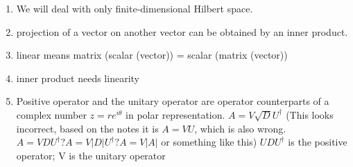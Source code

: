 \documentclass[a4paper,12pt]{amsbook}
\newcommand{\0}{{$|0\rangle$}}
\newcommand{\1}{{$|1\rangle$}}
\begin{document}
\begin{enumerate}
    \item We will deal with only finite-dimensional Hilbert space.
    \item projection of a vector on another vector can be obtained by an inner product. 
    \item linear means matrix (scalar (vector)) = scalar (matrix (vector))
    \item inner product needs linearity 
    \item Positive operator and the unitary operator are operator counterparts of a complex number $z = re^{i\theta}$ in polar representation. $A=V\sqrt{D}U^\dagger$ (This looks incorrect, based on the notes it is $A=VU$, which is also wrong. $A = V D U^\dagger? A=V|D|U^\dagger? A = V|A|$ or something like this) $UDU^\dagger$ is the positive operator; V is the unitary operator
\end{enumerate}
\end{document}
